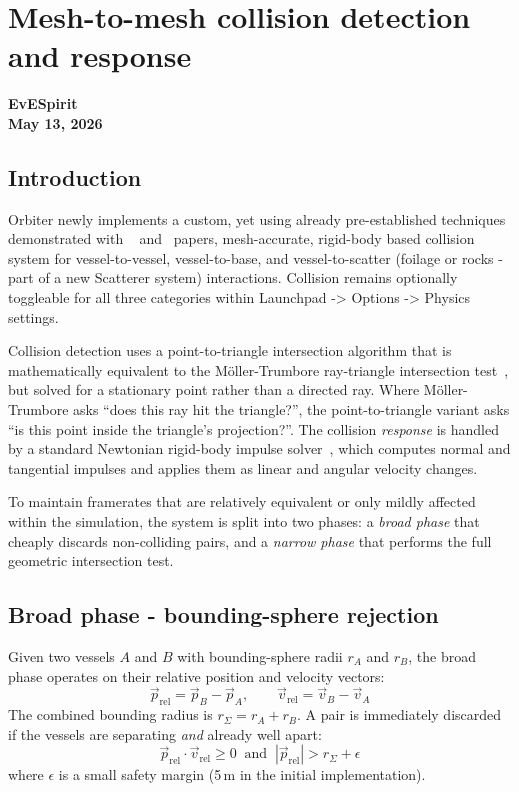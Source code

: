 \documentclass[Orbiter Technical Reference.tex]{subfiles}
\begin{document}
\section{Mesh-to-mesh collision detection and response}
\textbf{EvESpirit}\\
\textbf{May 13, 2026}


\subsection{Introduction}
Orbiter newly implements a custom, yet using already pre-established techniques demonstrated with ~\cite{moller1997} and~\cite{ibarra2003} papers,
mesh-accurate, rigid-body based collision system for vessel-to-vessel,
vessel-to-base, and vessel-to-scatter (foilage or rocks - part of a new Scatterer system) interactions.
Collision remains optionally toggleable for all three categories within Launchpad -> Options -> Physics settings.

Collision detection uses a point-to-triangle intersection algorithm that is
mathematically equivalent to the
M\"oller-Trumbore ray-triangle intersection test~\cite{moller1997},
but solved for a stationary point rather than a directed ray.
Where M\"oller-Trumbore asks ``does this ray hit the triangle?'', the
point-to-triangle variant asks ``is this point inside the triangle's
projection?''.
The collision \emph{response} is handled by a standard Newtonian rigid-body
impulse solver~\cite{ibarra2003}, which computes normal and tangential
impulses and applies them as linear and angular velocity changes.

To maintain framerates that are relatively equivalent
or only mildly affected within the simulation, the system is split into two phases:
a \emph{broad phase} that cheaply discards non-colliding pairs, and a
\emph{narrow phase} that performs the full geometric intersection test.


\subsection{Broad phase - bounding-sphere rejection}
\label{ssec:broadphase}
Given two vessels $A$ and $B$ with bounding-sphere radii
$r_A$ and $r_B$, the broad phase operates on their relative position and
velocity vectors:
\begin{equation*}
\vec{p}_{\mathrm{rel}} = \vec{p}_B - \vec{p}_A, \qquad
\vec{v}_{\mathrm{rel}} = \vec{v}_B - \vec{v}_A
\end{equation*}
The combined bounding radius is $r_{\Sigma} = r_A + r_B$.
A pair is immediately discarded if the vessels are separating
\emph{and} already well apart:
\begin{equation*}
\vec{p}_{\mathrm{rel}} \cdot \vec{v}_{\mathrm{rel}} \ge 0
\;\;\text{and}\;\;
|\vec{p}_{\mathrm{rel}}| > r_{\Sigma} + \epsilon
\end{equation*}
where $\epsilon$ is a small safety margin (5\,m in the initial implementation).
\end{document}
